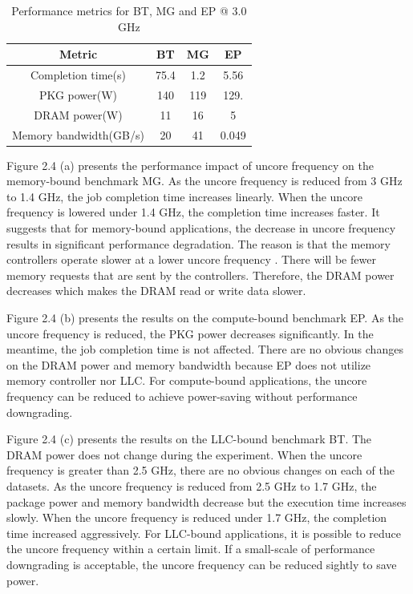 \begin{table} %
	\centering      %
	\begin{tabular}{|c|c|c|c|} %
		\hline
		\textbf{Metric} & \textbf{BT} &\textbf{MG} & \textbf{EP}  \\
		\hline
		Completion time(s)              & 75.4  & 1.2  &    5.56        \\
		\hline
		PKG power(W)	              &  140& 119 &   129.      \\
		\hline
		DRAM power(W)		 &   11 &   16 & 5 \\
		\hline	
		Memory bandwidth(GB/s)  &  20 & 41 & 0.049\\

		\hline

		
		
		\hline
	\end{tabular}
	\caption{Performance metrics for BT, MG and EP @ 3.0 GHz}
\end{table}

Figure 2.4 (a) presents the performance impact of uncore frequency on the memory-bound benchmark MG. As the uncore frequency is reduced from 3 GHz to 1.4 GHz, the job completion time increases linearly. When the uncore frequency is lowered under 1.4 GHz, the completion time increases faster. It suggests that for memory-bound applications, the decrease in uncore frequency results in significant performance degradation. The reason is that the memory controllers operate slower at a lower uncore frequency \cite{21}. There will be fewer memory requests that are sent by the controllers. Therefore, the DRAM power decreases which makes the DRAM read or write data slower. 

Figure 2.4 (b) presents the results on the compute-bound benchmark EP. As the uncore frequency is reduced, the PKG power decreases significantly. In the meantime, the job completion time is not affected. There are no obvious changes on the DRAM power and memory bandwidth because EP does not utilize memory controller nor LLC\cite{21}. For compute-bound applications, the uncore frequency can be reduced to achieve power-saving without performance downgrading.

Figure 2.4 (c) presents the results on the LLC-bound benchmark BT. The DRAM power does not change during the experiment. When the uncore frequency is greater than 2.5 GHz, there are no obvious changes on each of the datasets.  As the uncore frequency is reduced from 2.5 GHz to 1.7 GHz, the package power and memory bandwidth decrease but the execution time increases slowly. When the uncore frequency is reduced under 1.7 GHz, the completion time increased aggressively. For LLC-bound applications, it is possible to reduce the uncore frequency within a certain limit. If a small-scale of performance downgrading is acceptable, the uncore frequency can be reduced sightly to save power.

